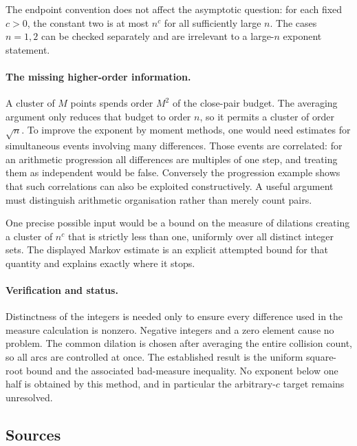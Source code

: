 \documentclass[11pt,a4paper]{article}
\begin{document}
The endpoint convention does not affect the asymptotic question: for each fixed $c>0$, the constant two is at most $n^c$ for all sufficiently large $n$. The cases $n=1,2$ can be checked separately and are irrelevant to a large-$n$ exponent statement.

\paragraph{The missing higher-order information.}
A cluster of $M$ points spends order $M^2$ of the close-pair budget. The averaging argument only reduces that budget to order $n$, so it permits a cluster of order $\sqrt n$. To improve the exponent by moment methods, one would need estimates for simultaneous events involving many differences. Those events are correlated: for an arithmetic progression all differences are multiples of one step, and treating them as independent would be false. Conversely the progression example shows that such correlations can also be exploited constructively. A useful argument must distinguish arithmetic organisation rather than merely count pairs.

One precise possible input would be a bound on the measure of dilations creating a cluster of $n^c$ that is strictly less than one, uniformly over all distinct integer sets. The displayed Markov estimate is an explicit attempted bound for that quantity and explains exactly where it stops.

\paragraph{Verification and status.}
Distinctness of the integers is needed only to ensure every difference used in the measure calculation is nonzero. Negative integers and a zero element cause no problem. The common dilation is chosen after averaging the entire collision count, so all arcs are controlled at once. The established result is the uniform square-root bound and the associated bad-measure inequality. No exponent below one half is obtained by this method, and in particular the arbitrary-$c$ target remains unresolved.

\subsection{Sources}
\end{document}
